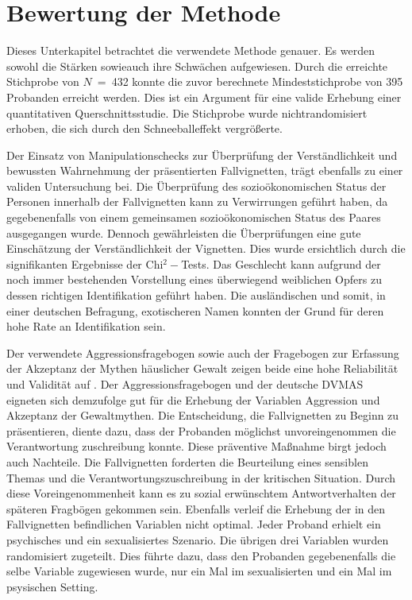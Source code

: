 \section{Bewertung der Methode}   \label{sec_5.3}
Dieses Unterkapitel betrachtet die verwendete Methode genauer. Es werden sowohl die Stärken sowieauch ihre Schwächen aufgewiesen.
Durch die erreichte Stichprobe von $N$~=~432 konnte die zuvor berechnete Mindeststichprobe von 395 Probanden erreicht werden. Dies ist ein Argument für eine valide Erhebung einer quantitativen Querschnittsstudie. Die Stichprobe wurde nichtrandomisiert erhoben, die sich durch den Schneeballeffekt vergrößerte.

Der Einsatz von Manipulationschecks zur Überprüfung der Verständlichkeit und bewussten Wahrnehmung der präsentierten Fallvignetten, trägt ebenfalls zu einer validen Untersuchung bei. Die Überprüfung des sozioökonomischen Status der Personen innerhalb der Fallvignetten kann zu Verwirrungen geführt haben, da gegebenenfalls von einem gemeinsamen sozioökonomischen Status des Paares ausgegangen wurde. Dennoch gewährleisten die Überprüfungen eine gute Einschätzung der Verständlichkeit der Vignetten. Dies wurde ersichtlich durch die signifikanten Ergebnisse der Chi$^2-$Tests. Das Geschlecht kann aufgrund der noch immer bestehenden Vorstellung eines überwiegend weiblichen Opfers zu dessen richtigen Identifikation geführt haben. Die ausländischen und somit, in einer deutschen Befragung, exotischeren Namen konnten der Grund für deren hohe Rate an Identifikation sein.

Der verwendete Aggressionsfragebogen sowie auch der Fragebogen zur Erfassung der Akzeptanz der Mythen häuslicher Gewalt zeigen beide eine hohe Reliabilität und Validität auf \parencite{Peters2003, Aggressionsfragebogen}. Der Aggressionsfragebogen und der deutsche DVMAS eigneten sich demzufolge gut für die Erhebung der Variablen Aggression und Akzeptanz der Gewaltmythen. 
Die Entscheidung, die Fallvignetten zu Beginn zu präsentieren, diente dazu, dass der Probanden möglichst unvoreingenommen die Verantwortung zuschreibung konnte. Diese präventive Maßnahme birgt jedoch auch Nachteile. Die Fallvignetten forderten die Beurteilung eines sensiblen Themas und die Verantwortungszuschreibung in der kritischen Situation. Durch diese Voreingenommenheit kann es zu sozial erwünschtem Antwortverhalten der späteren Fragbögen gekommen sein. Ebenfalls verleif die Erhebung der in den Fallvignetten befindlichen Variablen nicht optimal. Jeder Proband erhielt ein psychisches und ein sexualisiertes Szenario. Die übrigen drei Variablen wurden randomisiert zugeteilt. Dies führte dazu, dass den Probanden gegebenenfalls die selbe Variable zugewiesen wurde, nur ein Mal im sexualisierten und ein Mal im psysischen Setting. 

